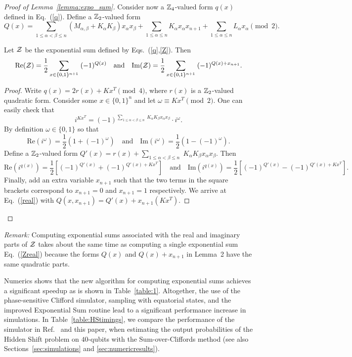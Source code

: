 \begin{proof}[Proof of Lemma~\ref{lemma:expo_sum}]
Consider now a $\mathbb{Z}_4$-valued form $q(x)$ defined in Eq.~(\ref{q}).
Define a $\mathbb{Z}_2$-valued form 
\begin{equation}
\label{Q}
Q(x)=\sum_{1\le \alpha<\beta \le n} (M_{\alpha,\beta} + K_\alpha K_\beta) x_\alpha x_\beta
+ \sum_{1\le \alpha \le n} K_\alpha x_\alpha x_{n+1} + \sum_{1\le \alpha\le n} L_\alpha x_\alpha {\pmod 2}.
\end{equation}
\begin{prop}
Let ${\cal Z }$ be the exponential sum defined by Eqs.~(\ref{q},\ref{Z}). Then 
\begin{equation}
\label{real}
\mathrm{Re}({\cal Z })=\frac12 \sum_{x\in \{0,1\}^{n+1}} \; (-1)^{Q(x)}
\quad \mbox{and} \quad
\mathrm{Im}({\cal Z })=\frac12 \sum_{x\in \{0,1\}^{n+1}} \; (-1)^{Q(x)+x_{n+1}}.
\end{equation}
\end{prop}
\begin{proof}
Write $q(x)=2r(x) + Kx^T  {\pmod 4}$, where $r(x)$ is a $\mathbb{Z}_2$-valued quadratic form.
Consider some $x\in \{0,1\}^n$ and let $\omega \equiv K x^T {\pmod 2}$.
One can easily check that
\[
i^{Kx^T } = (-1)^{\sum_{1\le \alpha<\beta\le n}\; K_\alpha K_\beta x_\alpha x_\beta} \cdot i^\omega.
\]
By definition $\omega\in \{0,1\}$ so that
\[
\mathrm{Re}(i^\omega)=\frac12 (1+(-1)^\omega) \quad \mbox{and} \quad
\mathrm{Im}(i^\omega)=\frac12 (1-(-1)^\omega).
\]
Define a $\mathbb{Z}_2$-valued form $Q'(x)=r(x) + \sum_{1\le \alpha<\beta\le n}\; K_\alpha K_\beta x_\alpha x_\beta$.
Then 
\[
\mathrm{Re}(i^{q(x)})=\frac12\left[  (-1)^{Q'(x)} + (-1)^{Q'(x) + K x^T}\right] \quad
\mbox{and} \quad
\mathrm{Im}(i^{q(x)})=\frac12\left[  (-1)^{Q'(x)} - (-1)^{Q'(x) + K x^T}\right].
\]
Finally, add an extra variable $x_{n+1}$ such that the two terms in the square brackets 
correspond to $x_{n+1}=0$ and $x_{n+1}=1$ respectively. We arrive at Eq.~(\ref{real})
with $Q(x,x_{n+1})=Q'(x) +x_{n+1}(K x^T)$.
\end{proof}
\end{proof}

{\em Remark:} Computing   exponential sums
associated with the real and imaginary parts
of ${\cal Z }$ takes about the same time as computing a single exponential sum
Eq.~(\ref{Zreal}) because the forms $Q(x)$ and $Q(x)+x_{n+1}$
in Lemma~2 have the same quadratic parts. 

Numerics shows that the new algorithm 
for computing exponential sums
achieves a significant speedup as is shown in Table~\ref{table:1}. Altogether, the use of the phase-sensitive Clifford simulator, sampling with equatorial states, and the improved Exponential Sum routine lead to a significant performance increase in simulations. In Table~\ref{table:HStimings}, we compare the performance of the simulator in Ref.~\cite{bravyi2016improved} and this paper, when estimating the output probabilities of the Hidden Shift problem on $40$-qubits with the Sum-over-Cliffords method (see also Sections~\ref{sec:simulations} and \ref{sec:numericresults}).

